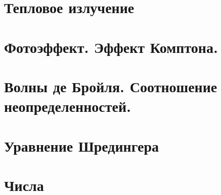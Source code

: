 % 


\section{Тепловое излучение}


\section{Фотоэффект. Эффект Комптона.}


\section{Волны де Бройля. Соотношение неопределенностей.}


\section{Уравнение Шредингера}


\newpage
\section{Числа}





\newpage
